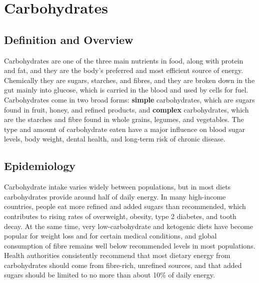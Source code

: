 \chapter{Carbohydrates}

\section*{Definition and Overview}
Carbohydrates are one of the three main nutrients in food, along with protein and fat, and they are the body's preferred and most efficient source of energy. Chemically they are sugars, starches, and fibres, and they are broken down in the gut mainly into glucose, which is carried in the blood and used by cells for fuel. Carbohydrates come in two broad forms: \textbf{simple} carbohydrates, which are sugars found in fruit, honey, and refined products, and \textbf{complex} carbohydrates, which are the starches and fibre found in whole grains, legumes, and vegetables. The type and amount of carbohydrate eaten have a major influence on blood sugar levels, body weight, dental health, and long-term risk of chronic disease.

\section*{Epidemiology}
Carbohydrate intake varies widely between populations, but in most diets carbohydrates provide around half of daily energy. In many high-income countries, people eat more refined and added sugars than recommended, which contributes to rising rates of overweight, obesity, type 2 diabetes, and tooth decay. At the same time, very low-carbohydrate and ketogenic diets have become popular for weight loss and for certain medical conditions, and global consumption of fibre remains well below recommended levels in most populations. Health authorities consistently recommend that most dietary energy from carbohydrates should come from fibre-rich, unrefined sources, and that added sugars should be limited to no more than about 10\% of daily energy.


